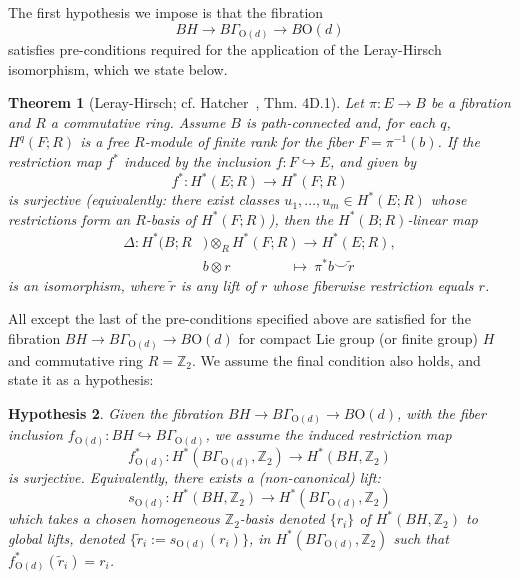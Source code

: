 \documentclass[aps,prx,reprint,superscriptaddress,twocolumn,amsmath,amssymb,amsfonts, nofootinbib]{revtex4-2}
\newcommand{\Z}{\mathbb{Z}}
\theoremstyle{apsstyle}
\newtheorem{theorem}{Theorem}[section]
\newtheorem{hypothesis}[theorem]{Hypothesis}
\begin{document}
The first hypothesis we impose is that the fibration 
\begin{equation*}
    BH \to B\Gamma_{\mathrm{O}(d)}\to B\mathrm{O}(d)    
\end{equation*}
satisfies pre-conditions required for the application of the Leray-Hirsch isomorphism, which we state below.

\bigskip 

\begin{theorem}[Leray-Hirsch; cf. Hatcher~\cite{Hatcher_AT}, Thm. 4D.1]
Let $\pi:E\to B$ be a fibration and $R$ a commutative ring. Assume $B$ is path-connected and, for each $q$, $H^{q}(F;R)$ is a free $R$-module of finite rank for the fiber $F=\pi^{-1}(b)$. If the restriction map $f^*$ induced by the inclusion $f:F \hookrightarrow E$, and given by
\begin{equation*}
f^*:H^{*}(E;R)\longrightarrow H^{*}(F;R)
\end{equation*}
is surjective (equivalently: there exist classes $u_1,\dots,u_m\in H^{*}(E;R)$ whose restrictions form an $R$-basis of $H^{*}(F;R)$), then the $H^{*}(B;R)$-linear map
\begin{align*}
\Delta : H^{*}(B;R&)\otimes_{R} H^{*}(F;R)\longrightarrow H^{*}(E;R),\\
&b\otimes r\ \qquad \qquad \longmapsto\ \pi^{*}b\smile \widetilde r
\end{align*}
is an isomorphism, where $\widetilde r$ is any lift of $r$ whose fiberwise restriction equals $r$. 
\end{theorem}

\bigskip 

\noindent All except the last of the pre-conditions specified above are satisfied for the fibration $BH \to B\Gamma_{\mathrm{O}(d)}\to B\mathrm{O}(d)$ for compact Lie group (or finite group) $H$ and commutative ring $R=\Z_{2}$. We assume the final condition also holds, and state it as a hypothesis:

\bigskip 

\begin{hypothesis}\label{hyp:1}
Given the fibration $BH\to B\Gamma_{\mathrm{O}(d)}\to B\mathrm{O}(d)$, with the fiber inclusion $f_{\mathrm{O}(d)}: BH \hookrightarrow B\Gamma_{\mathrm{O}(d)}$, we assume the induced restriction map 
\begin{equation*}
    f_{\mathrm{O}(d)}^{*}: H^{*}(B\Gamma_{\mathrm{O}(d)}, \Z_{2}) \to H^{*}(BH, \Z_{2}) 
\end{equation*}
is surjective. Equivalently, there exists a (non-canonical) lift:
\begin{equation*}
    s_{\mathrm{O}(d)}: H^{*}(BH, \Z_{2}) \to H^{*}(B\Gamma_{\mathrm{O}(d)}, \Z_{2})
\end{equation*}
which takes a chosen homogeneous $\Z_{2}$-basis denoted $\{r_{i}\}$ of $H^{*}(BH, \Z_{2})$ to global lifts, denoted $\{\widetilde{r}_i:=s_{\mathrm{O}(d)}(r_i)\}$, in $H^*(B\Gamma_{\mathrm{O}(d)},\Z_{2})$ such that $f_{\mathrm{O}(d)}^{*}(\widetilde{r}_{i})=r_i$.
\end{hypothesis}
\end{document}
